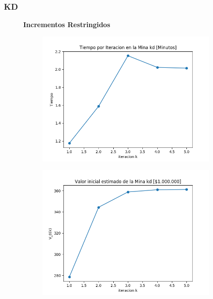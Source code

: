 \documentclass[12pt,letterpaper]{article}
\begin{document}
\subsubsection{KD}

\begin{figure}[H]
  \captionsetup[subfigure]{labelformat=empty}
  \centering
  \textbf{Incrementos Restringidos}
  
  \begin{subfigure}[b]{0.4\textwidth}
     \includegraphics[width=\textwidth]{Graficos/FiltradosCauchyRestringidos/kd_inc_times..png}
     \caption{}
     \label{fig:ex1}
  \end{subfigure}
  \begin{subfigure}[b]{0.4\textwidth}
     \includegraphics[width=\textwidth]{Graficos/FiltradosCauchyRestringidos/kd_inc_v_k..png}
     \caption{}
     \label{fig:ex2}
  \end{subfigure}
\end{figure}
\end{document}
